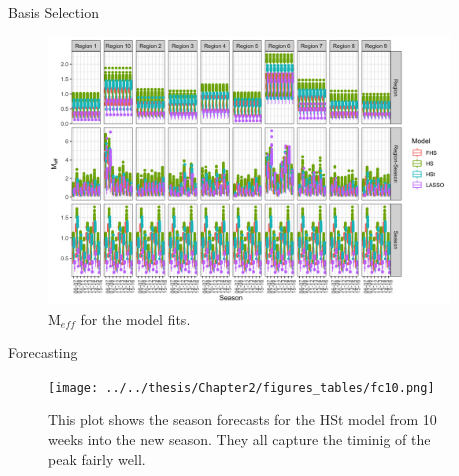 \documentclass[final]{beamer}
\newlength{\sepwid}
\newlength{\onecolwid}
\begin{document}
\begin{frame}[t]
\begin{columns}[t]
\begin{column}{\sepwid}\end{column} %

\begin{column}{\onecolwid} %


\begin{block}{Basis Selection}

\begin{figure}
\includegraphics[width=\linewidth]{plots/meff.png}
\caption{$\text{M}_{eff}$ for the model fits.}
\end{figure}


\end{block}

\vspace{-20mm}

\begin{block}{Forecasting}
\begin{figure}
\texttt{[image: ../../thesis/Chapter2/figures\_tables/fc10.png]}
\caption{This plot shows the season forecasts for the HSt model from 10 weeks into the new season. They all capture the timinig of the peak fairly well.}
\end{figure}
\end{block}


\end{column}
\end{columns}
\end{frame}
\end{document}
